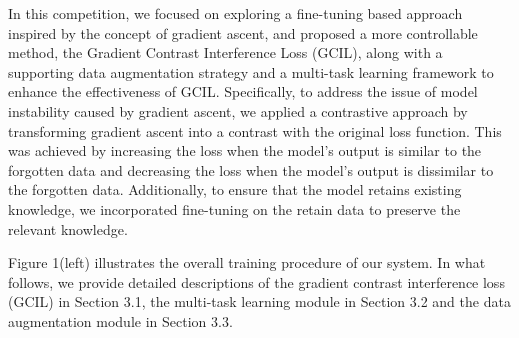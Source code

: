 \documentclass[11pt]{article}
\begin{document}
In this competition, we focused on exploring a fine-tuning based approach inspired by the concept of gradient ascent, and proposed a more controllable method, the Gradient Contrast Interference Loss (GCIL), along with a supporting data augmentation strategy and a multi-task learning framework to enhance the effectiveness of GCIL. Specifically, to address the issue of model instability caused by gradient ascent, we applied a contrastive approach by transforming gradient ascent into a contrast with the original loss function. This was achieved by increasing the loss when the model’s output is similar to the forgotten data and decreasing the loss when the model's output is dissimilar to the forgotten data. Additionally, to ensure that the model retains existing knowledge, we incorporated fine-tuning on the retain data to preserve the relevant knowledge.


Figure 1(left) illustrates the overall training procedure of our system. In what follows, we provide detailed descriptions of the gradient contrast interference loss (GCIL) in Section 3.1, the multi-task learning module in Section 3.2 and the data augmentation module in Section 3.3.



\end{document}
